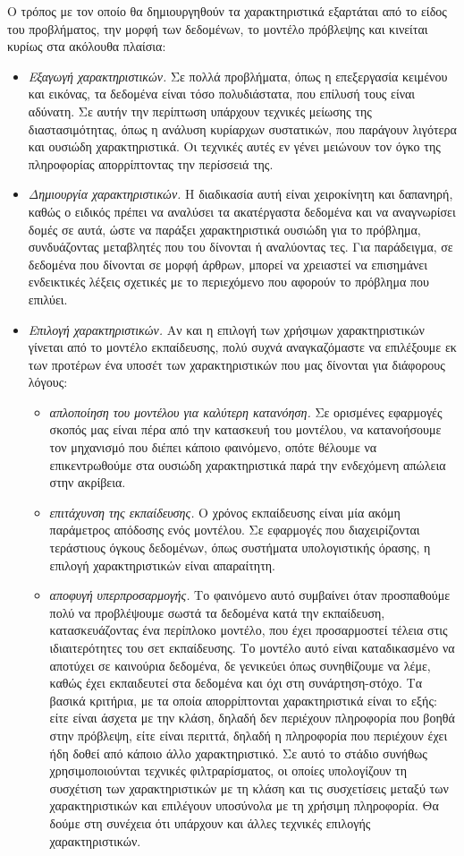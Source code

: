 \documentclass{article}
\begin{document}
Ο τρόπος με τον οποίο θα δημιουργηθούν τα χαρακτηριστικά εξαρτάται από το είδος του προβλήματος, την μορφή των δεδομένων, το μοντέλο πρόβλεψης και κινείται κυρίως στα ακόλουθα πλαίσια:
\begin{itemize}
\item \textit{Εξαγωγή χαρακτηριστικών.} Σε πολλά προβλήματα, όπως η επεξεργασία κειμένου και εικόνας, τα δεδομένα είναι τόσο πολυδιάστατα, που επίλυσή τους είναι αδύνατη. Σε αυτήν την περίπτωση υπάρχουν τεχνικές μείωσης της διαστασιμότητας, όπως η ανάλυση κυρίαρχων συστατικών, που παράγουν λιγότερα και ουσιώδη χαρακτηριστικά. Οι τεχνικές αυτές εν γένει μειώνουν τον όγκο της πληροφορίας απορρίπτοντας την περίσσειά της.
\item \textit{Δημιουργία χαρακτηριστικών.} Η διαδικασία αυτή είναι χειροκίνητη και δαπανηρή, καθώς ο ειδικός πρέπει να αναλύσει τα ακατέργαστα δεδομένα και να αναγνωρίσει δομές σε αυτά, ώστε να παράξει χαρακτηριστικά ουσιώδη για το πρόβλημα, συνδυάζοντας μεταβλητές που του δίνονται ή αναλύοντας τες. Για παράδειγμα, σε δεδομένα που δίνονται σε μορφή άρθρων, μπορεί να χρειαστεί να επισημάνει ενδεικτικές λέξεις σχετικές με το περιεχόμενο που αφορούν το πρόβλημα που επιλύει.
\item \textit{Επιλογή χαρακτηριστικών.} Αν και η επιλογή των χρήσιμων χαρακτηριστικών γίνεται από το μοντέλο εκπαίδευσης, πολύ συχνά αναγκαζόμαστε να επιλέξουμε εκ των προτέρων ένα υποσέτ των χαρακτηριστικών που μας δίνονται για διάφορους λόγους:
\begin{itemize}
\item \textit{απλοποίηση του μοντέλου για καλύτερη κατανόηση.} Σε ορισμένες εφαρμογές σκοπός μας είναι πέρα από την κατασκευή του μοντέλου, να κατανοήσουμε τον μηχανισμό που διέπει κάποιο φαινόμενο, οπότε θέλουμε να επικεντρωθούμε στα ουσιώδη χαρακτηριστικά παρά την ενδεχόμενη απώλεια στην ακρίβεια.
\item \textit{επιτάχυνση της εκπαίδευσης.} Ο χρόνος εκπαίδευσης είναι μία ακόμη παράμετρος απόδοσης ενός μοντέλου. Σε εφαρμογές που διαχειρίζονται τεράστιους όγκους δεδομένων, όπως συστήματα υπολογιστικής όρασης, η επιλογή χαρακτηριστικών είναι απαραίτητη.
\item \textit{αποφυγή υπερπροσαρμογής.} Το φαινόμενο αυτό συμβαίνει όταν προσπαθούμε πολύ να προβλέψουμε σωστά τα δεδομένα κατά την εκπαίδευση, κατασκευάζοντας ένα περίπλοκο μοντέλο, που έχει προσαρμοστεί τέλεια στις ιδιαιτερότητες του σετ εκπαίδευσης. Το μοντέλο αυτό είναι καταδικασμένο να αποτύχει σε καινούρια δεδομένα, δε γενικεύει όπως συνηθίζουμε να λέμε, καθώς έχει εκπαιδευτεί στα δεδομένα και όχι στη συνάρτηση-στόχο.
Τα βασικά κριτήρια, με τα οποία απορρίπτονται χαρακτηριστικά είναι το εξής: είτε είναι άσχετα με την κλάση, δηλαδή δεν περιέχουν πληροφορία που βοηθά στην πρόβλεψη, είτε είναι περιττά, δηλαδή η πληροφορία που περιέχουν έχει ήδη δοθεί από κάποιο άλλο χαρακτηριστικό. Σε αυτό το στάδιο συνήθως χρησιμοποιούνται τεχνικές φιλτραρίσματος, οι οποίες υπολογίζουν τη συσχέτιση των χαρακτηριστικών με τη κλάση και τις συσχετίσεις μεταξύ των χαρακτηριστικών και επιλέγουν υποσύνολα με τη χρήσιμη πληροφορία. Θα δούμε στη συνέχεια ότι υπάρχουν και άλλες τεχνικές επιλογής χαρακτηριστικών.
\end{itemize}
\end{itemize}
\end{document}
